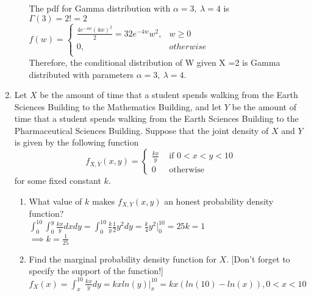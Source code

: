 \documentclass[11pt]{article}
\begin{document}
\begin{enumerate}[label=\textbf{Question \arabic*:},start=1]
\begin{enumerate}
The pdf for Gamma distribution with $\alpha=3,\ \lambda=4$ is \\
$\Gamma(3) = 2! = 2$ \\
$f(w) = \begin{cases}
		\frac{4 e^{-4w} (4w)^2}{2} = 32 e^{-4w} w^2, & w \geq 0 \\ 
		0, & otherwise\\
		\end{cases}$\\

Therefore, the conditional distribution of W given X =2 is Gamma distributed with parameters $\alpha=3,\ \lambda=4$.

\end{enumerate}




\item Let $X$ be the amount of time that a student spends walking from the Earth Sciences Building to the Mathematics Building, and let $Y$ be the amount of time that a student spends walking from the Earth Sciences Building to the Pharmaceutical Sciences Building. Suppose that the joint density of $X$ and $Y$ is given by the following function
\[
f_{X,Y}(x,y) = \left\{
\begin{array}{ll}
\frac {kx}y & \mbox{ if } 0 < x < y < 10 \\
0 & \mbox{ otherwise} 
\end{array}
\right.
\]
for some fixed constant $k$. 
\begin{enumerate}
	\item What value of $k$ makes $f_{X,Y}(x,y)$ an honest probability density function?\\
	
	$\displaystyle{ \int_{0}^{10} \int_{0}^{y} \frac{kx}{y} dx dy = \int_{0}^{10} \frac{k}{y} \frac{1}{2} y^2 dy = \frac{k}{4} y^2|_{0}^{10}= 25k = 1 }$ \\
	$\displaystyle{ \implies k = \frac{1}{25} }$ \\

	\item Find the marginal probability density function for $X$. [Don't forget to specify the support of the function!]\\
	
	$\displaystyle{ f_X(x) = \int_{x}^{10} \frac{kx}{y} dy = kx ln(y)|_{x}^{10} = kx (ln(10) - ln(x)), 0 < x <10 }$\\
	

\end{enumerate}
\end{enumerate}
\end{document}
